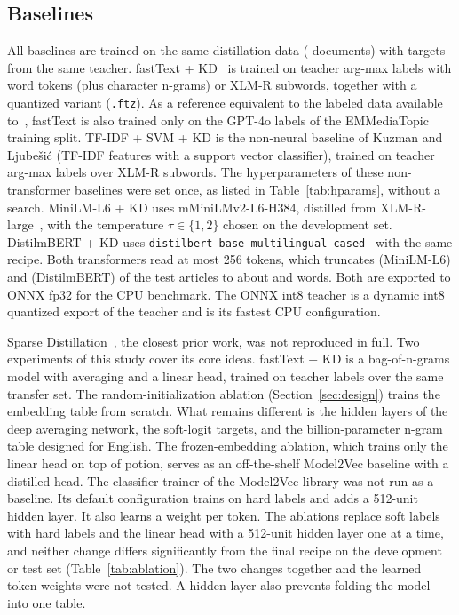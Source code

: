 \subsection{Baselines}
All baselines are trained on the same distillation data ( documents) with targets from the same teacher. fastText + KD~\cite{joulin2017bag} is trained on teacher arg-max labels with word tokens (plus character n-grams) or XLM-R subwords, together with a quantized variant (\texttt{.ftz}). As a reference equivalent to the labeled data available to~\cite{kuzman2025llm}, fastText is also trained only on the GPT-4o labels of the EMMediaTopic training split. TF-IDF + SVM + KD is the non-neural baseline of Kuzman and Ljube\v{s}i\'c (TF-IDF features with a support vector classifier), trained on teacher arg-max labels over XLM-R subwords. The hyperparameters of these non-transformer baselines were set once, as listed in Table~\ref{tab:hparams}, without a search. MiniLM-L6 + KD uses mMiniLMv2-L6-H384, distilled from XLM-R-large~\cite{wang2021minilmv2}, with the temperature $\tau\in\{1,2\}$ chosen on the development set. DistilmBERT + KD uses \texttt{distilbert-base-multilingual-cased}~\cite{sanh2019distilbert} with the same recipe. Both transformers read at most 256 tokens, which truncates  (MiniLM-L6) and  (DistilmBERT) of the test articles to about  and  words. Both are exported to ONNX fp32 for the CPU benchmark. The ONNX int8 teacher is a dynamic int8 quantized export of the teacher and is its fastest CPU configuration.

Sparse Distillation~\cite{ye2022sparse}, the closest prior work, was not reproduced in full. Two experiments of this study cover its core ideas. fastText + KD is a bag-of-n-grams model with averaging and a linear head, trained on teacher labels over the same transfer set. The random-initialization ablation (Section~\ref{sec:design}) trains the embedding table from scratch. What remains different is the hidden layers of the deep averaging network, the soft-logit targets, and the billion-parameter n-gram table designed for English. The frozen-embedding ablation, which trains only the linear head on top of potion, serves as an off-the-shelf Model2Vec baseline with a distilled head. The classifier trainer of the Model2Vec library was not run as a baseline. Its default configuration trains on hard labels and adds a 512-unit hidden layer. It also learns a weight per token. The ablations replace soft labels with hard labels and the linear head with a 512-unit hidden layer one at a time, and neither change differs significantly from the final recipe on the development or test set (Table~\ref{tab:ablation}). The two changes together and the learned token weights were not tested. A hidden layer also prevents folding the model into one table.

